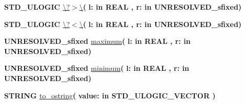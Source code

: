 \begin{DoxyCompactItemize}
\item 
{\bfseries {\bfseries \textcolor{comment}{S\+T\+D\+\_\+\+U\+L\+O\+G\+I\+C}\textcolor{vhdlchar}{ }}} \hyperlink{class__fixed__pkg_a9e6b6b8c2c14da978e6f70cb6e85e6dc}{\textbackslash{}?$>$\textbackslash{}}{\bfseries  ( }{\bfseries \textcolor{vhdlchar}{l\+: }\textcolor{stringliteral}{in }{\bfseries \textcolor{comment}{R\+E\+A\+L}\textcolor{vhdlchar}{ }}}{\bfseries  , \textcolor{vhdlchar}{r\+: }\textcolor{stringliteral}{in }\textcolor{vhdlchar}{U\+N\+R\+E\+S\+O\+L\+V\+E\+D\+\_\+sfixed}}{\bfseries  )} 
\item 
{\bfseries {\bfseries \textcolor{comment}{S\+T\+D\+\_\+\+U\+L\+O\+G\+I\+C}\textcolor{vhdlchar}{ }}} \hyperlink{class__fixed__pkg_a7e98e66a4a282c529968f69f70dd16ad}{\textbackslash{}?$<$\textbackslash{}}{\bfseries  ( }{\bfseries \textcolor{vhdlchar}{l\+: }\textcolor{stringliteral}{in }{\bfseries \textcolor{comment}{R\+E\+A\+L}\textcolor{vhdlchar}{ }}}{\bfseries  , \textcolor{vhdlchar}{r\+: }\textcolor{stringliteral}{in }\textcolor{vhdlchar}{U\+N\+R\+E\+S\+O\+L\+V\+E\+D\+\_\+sfixed}}{\bfseries  )} 
\item 
{\bfseries {\bfseries \textcolor{vhdlchar}{U\+N\+R\+E\+S\+O\+L\+V\+E\+D\+\_\+sfixed}\textcolor{vhdlchar}{ }}} \hyperlink{class__fixed__pkg_a427ed4c94126ca4966f81712b325a314}{maximum}{\bfseries  ( }{\bfseries \textcolor{vhdlchar}{l\+: }\textcolor{stringliteral}{in }{\bfseries \textcolor{comment}{R\+E\+A\+L}\textcolor{vhdlchar}{ }}}{\bfseries  , \textcolor{vhdlchar}{r\+: }\textcolor{stringliteral}{in }\textcolor{vhdlchar}{U\+N\+R\+E\+S\+O\+L\+V\+E\+D\+\_\+sfixed}}{\bfseries  )} 
\item 
{\bfseries {\bfseries \textcolor{vhdlchar}{U\+N\+R\+E\+S\+O\+L\+V\+E\+D\+\_\+sfixed}\textcolor{vhdlchar}{ }}} \hyperlink{class__fixed__pkg_ac6e7f426014fe929a97c17a175463b51}{minimum}{\bfseries  ( }{\bfseries \textcolor{vhdlchar}{l\+: }\textcolor{stringliteral}{in }{\bfseries \textcolor{comment}{R\+E\+A\+L}\textcolor{vhdlchar}{ }}}{\bfseries  , \textcolor{vhdlchar}{r\+: }\textcolor{stringliteral}{in }\textcolor{vhdlchar}{U\+N\+R\+E\+S\+O\+L\+V\+E\+D\+\_\+sfixed}}{\bfseries  )} 
\item 
{\bfseries {\bfseries \textcolor{comment}{S\+T\+R\+I\+N\+G}\textcolor{vhdlchar}{ }}} \hyperlink{class__fixed__pkg_aa4e5c418f084f52cb97589cd0ea72a57}{to\+\_\+ostring}{\bfseries  ( }{\bfseries \textcolor{vhdlchar}{value\+: }\textcolor{stringliteral}{in }{\bfseries \textcolor{comment}{S\+T\+D\+\_\+\+U\+L\+O\+G\+I\+C\+\_\+\+V\+E\+C\+T\+O\+R}\textcolor{vhdlchar}{ }}}{\bfseries  )} 
\item 

\end{DoxyCompactItemize}
